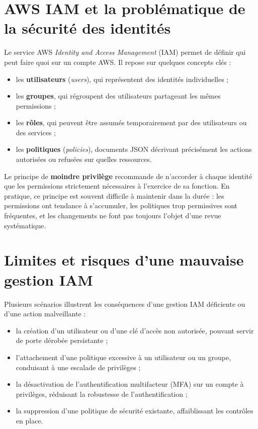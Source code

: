 \documentclass[11pt,a4paper]{report}
\begin{document}
\section{AWS IAM et la problématique de la sécurité des identités}

Le service AWS \textit{Identity and Access Management} (IAM) permet de définir qui peut faire quoi sur un compte AWS. Il repose sur quelques concepts clés :

\begin{itemize}[leftmargin=1.4em]
  \item les \textbf{utilisateurs} (\textit{users}), qui représentent des identités individuelles ;
  \item les \textbf{groupes}, qui régroupent des utilisateurs partageant les mêmes permissions ;
  \item les \textbf{rôles}, qui peuvent être assumés temporairement par des utilisateurs ou des services ;
  \item les \textbf{politiques} (\textit{policies}), documents JSON décrivant précisément les actions autorisées ou refusées sur quelles ressources.
\end{itemize}

Le principe de \textbf{moindre privilège} recommande de n'accorder à chaque identité que les permissions strictement nécessaires à l'exercice de sa fonction. En pratique, ce principe est souvent difficile à maintenir dans la durée : les permissions ont tendance à s'accumuler, les politiques trop permissives sont fréquentes, et les changements ne font pas toujours l'objet d'une revue systématique.

\section{Limites et risques d'une mauvaise gestion IAM}

Plusieurs scénarios illustrent les conséquences d'une gestion IAM déficiente ou d'une action malveillante :

\begin{itemize}[leftmargin=1.4em]
  \item la création d'un utilisateur ou d'une clé d'accès non autorisée, pouvant servir de porte dérobée persistante ;
  \item l'attachement d'une politique excessive à un utilisateur ou un groupe, conduisant à une escalade de privilèges ;
  \item la désactivation de l'authentification multifacteur (MFA) sur un compte à privilèges, réduisant la robustesse de l'authentification ;
  \item la suppression d'une politique de sécurité existante, affaiblissant les contrôles en place.
\end{itemize}
\end{document}
